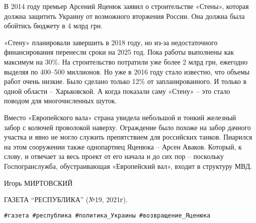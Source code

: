 В 2014 году премьер Арсений Яценюк заявил о строительстве «Стены», которая
должна защитить Украину от возможного вторжения России. Она должна была
обойтись бюджету в 4 млрд грн.

«Стену» планировали завершить в 2018 году, но из-за недостаточного
финансирования перенесли сроки на 2025 год. Пока работы выполнены как максимум
на 30\%. На строительство потратили уже более 2 млрд грн, ежегодно выделяя по
400–500 миллионов. Но уже в 2016 году стало известно, что объемы работ очень
низкие. Было сделано только 12\% от запланированного. И только в одной области
– Харьковской. А когда показали саму «Стену» – это стало поводом для
многочисленных шуток.

Вместо «Европейского вала» страна увидела небольшой и тонкий железный забор с
колючей проволокой наверху. Ограждение было похоже на забор дачного участка и
явно не могло служить препятствием для российских танков. Пиарился на этом
сооружении также однопартиец Яценюка – Арсен Аваков. Который, к слову, и
отвечает за весь проект от его начала и до сих пор – поскольку Госпогранслужба,
обустраивающая «Европейский вал», входит в структуру МВД.

Игорь МИРТОВСКИЙ

ГАЗЕТА \enquote{РЕСПУБЛИКА} (№19, 2021г).

\verb|#газета #республика #политика_Украины #возвращение_Яценюка|
